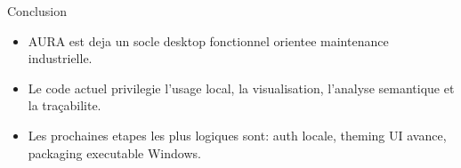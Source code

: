 \documentclass[10pt]{beamer}
\begin{document}
\begin{frame}{Conclusion}
\begin{itemize}
\item AURA est deja un socle desktop fonctionnel orientee maintenance industrielle.
\item Le code actuel privilegie l'usage local, la visualisation, l'analyse semantique et la traçabilite.
\item Les prochaines etapes les plus logiques sont: auth locale, theming UI avance, packaging executable Windows.
\end{itemize}
\end{frame}
\end{document}
